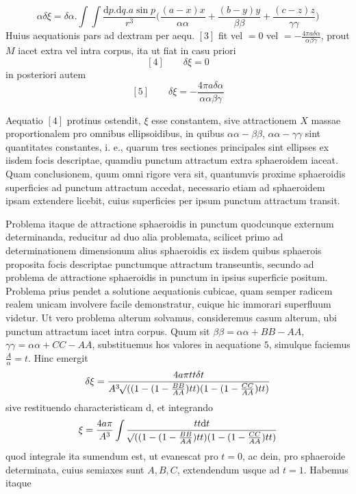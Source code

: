 \[
\alpha\delta\xi=\delta\alpha.\int\!\int\frac{\mathrm{d}p.\mathrm{d}q.a\sin p}{r^3}\bigl(\frac{(a-x)x}{\alpha\alpha}+\frac{(b-y)y}{\beta\beta}+\frac{(c-z)z}{\gamma\gamma}\bigr)
\]
Huius aequationis pars ad dextram per aequ. $[3]$ fit vel $=0$ vel $=-\frac{4\pi a\delta\alpha}{\alpha\beta\gamma}$, prout $M$ iacet extra vel intra corpus, ita ut fiat in casu priori
\[
[4]\qquad\delta\xi=0
\]
in posteriori autem
\[
[5]\qquad\delta\xi=-\frac{4\pi a\delta\alpha}{\alpha\alpha\beta\gamma}
\]
\par
Aequatio $[4]$ protinus ostendit, $\xi$ esse constantem, sive attractionem $X$ massae proportionalem pro omnibus ellipsoidibus, in quibus $\alpha\alpha-\beta\beta$, $\alpha\alpha-\gamma\gamma$ sint quantitates constantes, i. e., quarum tres sectiones principales sint ellipses ex iisdem focis descriptae, quamdiu punctum attractum extra sphaeroidem iaceat. Quam conclusionem, quum omni rigore vera sit, quantumvis proxime sphaeroidis superficies ad punctum attractum accedat, necessario etiam ad sphaeroidem ipsam extendere licebit, cuius superficies per ipsum punctum attractum transit.

Problema itaque de attractione sphaeroidis in punctum quodcunque externum determinanda, reducitur ad duo alia problemata, scilicet primo ad determinationem dimensionum alius sphaeroidis ex iisdem quibus sphaerois proposita focis descriptae punctumque attractum transeuntis, secundo ad problema de attractione sphaeroidis in punctum in ipsius superficie positum. Problema prius pendet a solutione aequationis cubicae, quam semper radicem realem unicam involvere facile demonstratur, cuique hic immorari superfluum videtur. Ut vero problema alterum solvamus, consideremus casum alterum, ubi punctum attractum iacet intra corpus. Quum sit $\beta\beta=\alpha\alpha+BB-AA$, $\gamma\gamma=\alpha\alpha+CC-AA$, substituemus hos valores in aequatione $5$, simulque faciemus $\frac{A}{\alpha}=t$. Hinc emergit
\[
\delta\xi=\frac{4a\pi tt\delta t}{A^3\mathord{{}^{}\!\surd}((1-(1-\frac{BB}{AA})tt)(1-(1-\frac{CC}{AA})tt)}
\]
sive restituendo characteristicam $\mathrm{d}$, et integrando
\[
\xi=\frac{4a\pi}{A^3}\int\frac{tt\mathrm{d}t}{\mathord{{}^{}\!\surd}((1-(1-\frac{BB}{AA})tt)(1-(1-\frac{CC}{AA})tt)}
\]
quod integrale ita sumendum est, ut evanescat pro $t=0$, ac dein, pro sphaeroide determinata, cuius semiaxes sunt $A,B,C$, extendendum usque ad $t=1$. Habemus itaque
